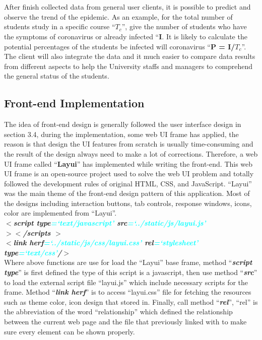 \documentclass[12pt]{article}
\begin{document}
\\
\\After finish collected data from general user clients, it is possible to predict and observe the trend of the epidemic. As an example, for the total number of students study in a specific course ``\textbf{$T_c$}'', give the number of students who have the symptoms of coronavirus or already infected ``\textbf{I}. It is likely to calculate the potential percentages of the students be infected will coronavirus ``\textbf{P = I/$T_c$}''. The client will also integrate the data and it much easier to compare data results from different aspects to help the University staffs and managers to comprehend the general status of the students.
\subsection{Front-end Implementation}
The idea of front-end design is generally followed the user interface design in section 3.4, during the implementation, some web UI frame has applied, the reason is that design the UI features from scratch is usually time-consuming and the result of the design always need to make a lot of corrections. Therefore, a web UI frame called ``\textbf{Layui}''  has implemented while writing the front-end. This web UI frame is an open-source project used to solve the web UI problem and totally followed the development rules of original HTML, CSS, and JavaScript. ``Layui'' was the main theme of the front-end design pattern of this application. Most of the designs including interaction buttons, tab controls, response windows, icons, color are implemented from ``Layui''. 
\\\textit{\textbf{$\mathbf{<}$script type\textcolor{cyan}{=`text/javascript'} src\textcolor{cyan}{=`../static/js/layui.js'}\\$\mathbf{><}$/scripts $\mathbf{>}$}}
\\\textit{\textbf{$\mathbf{<}$link herf\textcolor{cyan}{=`../static/js/css/layui.css'} rel\textcolor{cyan}{=`stylesheet'} \\type\textcolor{cyan}{=`text/css'}/$ \mathbf{>}$}}
\\Where above functions are use for load the ``Layui'' base frame, method ``\textit{\textbf{script type}}'' is first defined the type of this script is a javascript, then use method ``\textit{\textbf{src}}'' to load the external script file ``layui.js'' which include necessary scripts for the frame. Method ``\textit{\textbf{link herf}}'' is to access ``layui.css'' file for fetching the resources such as theme color, icon design that stored in. Finally, call method ``\textit{\textbf{rel}}'', ``rel'' is the abbreviation of the word ``relationship'' which defined the relationship between the current web page and the file that previously linked with to make sure every element can be shown properly.
\end{document}
